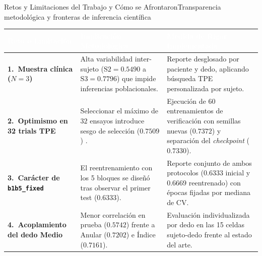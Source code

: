 \begin{frame}{Retos y Limitaciones del Trabajo y C\'omo se Afrontaron}{Transparencia metodol\'ogica y fronteras de inferencia cient\'ifica \cite{cawley2010overfitting,rodas_valencia_tpe_ecog}}
  \vfill
  \centering
  {\footnotesize
  \renewcommand{\arraystretch}{1.34}
  \setlength{\tabcolsep}{6pt}
  \begin{tabularx}{\textwidth}{@{} l >{\raggedright\arraybackslash}X >{\raggedright\arraybackslash}X @{}}
    \toprule
    \rowcolor{ipnDark}
    \textcolor{white}{\textbf{Reto o Limitaci\'on}} &
    \textcolor{white}{\textbf{Implicaci\'on Metodol\'ogica}} &
    \textcolor{white}{\textbf{Medida de Rigor Implementada}} \\
    \midrule
    \textbf{1.\ Muestra cl\'inica ($N=3$)} & Alta variabilidad inter-sujeto ($\text{S2}=0.5490$ a $\text{S3}=0.7796$) que impide inferencias poblacionales. & Reporte desglosado por paciente y dedo, aplicando b\'usqueda TPE personalizada por sujeto. \\
    \rowcolor{rowLight}
    \textbf{2.\ Optimismo en 32 trials TPE} & Seleccionar el m\'aximo de $32$ ensayos introduce sesgo de selecci\'on ($0.7509$) \cite{cawley2010overfitting}. & Ejecuci\'on de $60$ entrenamientos de verificaci\'on con semillas nuevas ($0.7372$) y separaci\'on del \textit{checkpoint} ($0.7330$). \\
    \textbf{3.\ Car\'acter de \texttt{b1b5\_fixed}} & El reentrenamiento con los 5 bloques se dise\~n\'o tras observar el primer test ($0.6333$). & Reporte conjunto de ambos protocolos ($0.6333$ inicial y $0.6669$ reentrenado) con \'epocas fijadas por mediana de CV. \\
    \rowcolor{rowLight}
    \textbf{4.\ Acoplamiento del dedo Medio} & Menor correlaci\'on en prueba ($0.5742$) frente a Anular ($0.7202$) e \'Indice ($0.7161$). & Evaluaci\'on individualizada por dedo en las 15 celdas sujeto-dedo frente al estado del arte. \\
    \bottomrule
  \end{tabularx}
  }
  \vfill
\end{frame}

